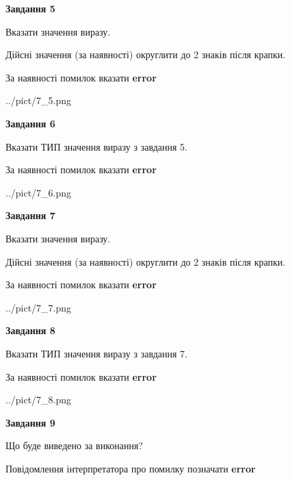 \documentclass[11pt, ukrainian]{article}
\begin{document}
{\begin {large}
{\begin {center}\textbf{Завдання 5}\end {center}}\par
Вказати значення виразу. \par
Дійсні значення (за наявності) округлити до 2 знаків після крапки. \par
За наявності помилок вказати \textbf{error}

\begin{center}
	{../pict/7_5.png}
\end{center}
\newpage

{\begin {center}\textbf{Завдання 6}\end {center}}\par
Вказати ТИП значення виразу з завдання 5. \par
За наявності помилок вказати \textbf{error}

\begin{center}
	{../pict/7_6.png}
\end{center}
\newpage

{\begin {center}\textbf{Завдання 7}\end {center}}\par
Вказати значення виразу. \par
Дійсні значення (за наявності) округлити до 2 знаків після крапки. \par
За наявності помилок вказати \textbf{error}

\begin{center}
	{../pict/7_7.png}
\end{center}
\newpage

{\begin {center}\textbf{Завдання 8}\end {center}}\par
Вказати ТИП значення виразу з завдання 7. \par
За наявності помилок вказати \textbf{error}

\begin{center}
	{../pict/7_8.png}
\end{center}
\newpage

{\begin {center}\textbf{Завдання 9}\end {center}}\par
Що буде виведено за виконання? \par
Повідомлення інтерпретатора про помилку позначати \textbf{error}


\end{large}}
\end{document}
